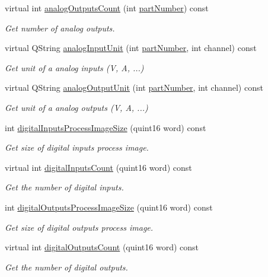\begin{DoxyCompactItemize}
virtual int \hyperlink{classmdt_device_modbus_wago_module_ab97fe52c4538a80ccdf5fa1b04c119b6}{analog\-Outputs\-Count} (int \hyperlink{classmdt_device_modbus_wago_module_ab694800ebccf308beb9eeb9a789b0442}{part\-Number}) const 
\begin{DoxyCompactList}\small\item\em Get number of analog outputs. \end{DoxyCompactList}\item 
virtual Q\-String \hyperlink{classmdt_device_modbus_wago_module_adbf2b96c5ab43a1693b5d656f84e893d}{analog\-Input\-Unit} (int \hyperlink{classmdt_device_modbus_wago_module_ab694800ebccf308beb9eeb9a789b0442}{part\-Number}, int channel) const 
\begin{DoxyCompactList}\small\item\em Get unit of a analog inputs (V, A, ...) \end{DoxyCompactList}\item 
virtual Q\-String \hyperlink{classmdt_device_modbus_wago_module_a239892e92ee3f062e1000301766877aa}{analog\-Output\-Unit} (int \hyperlink{classmdt_device_modbus_wago_module_ab694800ebccf308beb9eeb9a789b0442}{part\-Number}, int channel) const 
\begin{DoxyCompactList}\small\item\em Get unit of a analog outputs (V, A, ...) \end{DoxyCompactList}\item 
int \hyperlink{classmdt_device_modbus_wago_module_aec8434b67b73b60f218e0fe4abe0e553}{digital\-Inputs\-Process\-Image\-Size} (quint16 word) const 
\begin{DoxyCompactList}\small\item\em Get size of digital inputs process image. \end{DoxyCompactList}\item 
virtual int \hyperlink{classmdt_device_modbus_wago_module_a96ae9148d769fec6905d360c5262d0eb}{digital\-Inputs\-Count} (quint16 word) const 
\begin{DoxyCompactList}\small\item\em Get the number of digital inputs. \end{DoxyCompactList}\item 
int \hyperlink{classmdt_device_modbus_wago_module_a40513e96468455295608a788eb1d8cac}{digital\-Outputs\-Process\-Image\-Size} (quint16 word) const 
\begin{DoxyCompactList}\small\item\em Get size of digital outputs process image. \end{DoxyCompactList}\item 
virtual int \hyperlink{classmdt_device_modbus_wago_module_ac425538b1ae0be825929d58a9713c788}{digital\-Outputs\-Count} (quint16 word) const 
\begin{DoxyCompactList}\small\item\em Get the number of digital outputs. \end{DoxyCompactList}\end{DoxyCompactItemize}


